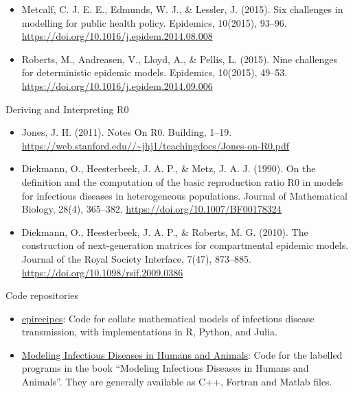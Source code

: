 \documentclass[
  ignorenonframetext,
]{beamer}
\providecommand{\tightlist}{%
  \setlength{\itemsep}{0pt}\setlength{\parskip}{0pt}}\usepackage{longtable,booktabs,array}
\begin{document}
\begin{frame}
\begin{itemize}
\item
  Metcalf, C. J. E. E., Edmunds, W. J., \& Lessler, J. (2015). Six
  challenges in modelling for public health policy. Epidemics, 10(2015),
  93--96. \url{https://doi.org/10.1016/j.epidem.2014.08.008}
\item
  Roberts, M., Andreasen, V., Lloyd, A., \& Pellis, L. (2015). Nine
  challenges for deterministic epidemic models. Epidemics, 10(2015),
  49--53. \url{https://doi.org/10.1016/j.epidem.2014.09.006}
\end{itemize}
\end{frame}

\begin{frame}
\begin{block}{Deriving and Interpreting R0}
\label{deriving-and-interpreting-r0}
\begin{itemize}
\item
  Jones, J. H. (2011). Notes On R0. Building, 1--19.
  \url{https://web.stanford.edu//~jhj1/teachingdocs/Jones-on-R0.pdf}
\item
  Diekmann, O., Heesterbeek, J. A. P., \& Metz, J. A. J. (1990). On the
  definition and the computation of the basic reproduction ratio R0 in
  models for infectious diseases in heterogeneous populations. Journal
  of Mathematical Biology, 28(4), 365--382.
  \url{https://doi.org/10.1007/BF00178324}
\end{itemize}
\end{block}
\end{frame}

\begin{frame}
\begin{itemize}
\tightlist
\item
  Diekmann, O., Heesterbeek, J. A. P., \& Roberts, M. G. (2010). The
  construction of next-generation matrices for compartmental epidemic
  models. Journal of the Royal Society Interface, 7(47), 873--885.
  \url{https://doi.org/10.1098/rsif.2009.0386}
\end{itemize}
\end{frame}

\begin{frame}
\begin{block}{Code repositories}
\label{code-repositories}
\begin{itemize}
\item
  \href{http://epirecip.es/epicookbook/}{epirecipes}: Code for collate
  mathematical models of infectious disease transmission, with
  implementations in R, Python, and Julia.
\item
  \href{http://www.modelinginfectiousdiseases.org/}{Modeling Infectious
  Diseases in Humans and Animals}: Code for the labelled programs in the
  book ``Modeling Infectious Diseases in Humans and Animals''. They are
  generally available as C++, Fortran and Matlab files.
\end{itemize}
\end{block}
\end{frame}
\end{document}
